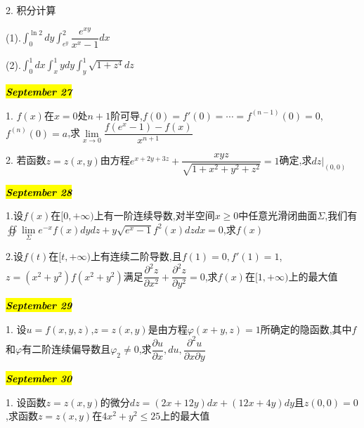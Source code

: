 2. 积分计算

(1).$\int_{0}^{\ln 2}dy\int_{e^{y}}^{2}\dfrac{e^{xy}}{x^{x}-1}dx$

(2).$\int_{0}^{1}dx\int_{x}^{1}ydy\int_{y}^{1}\sqrt{1+z^4}dz$
\begin{solution}
	
\end{solution}

\hl{\textbf{\textit{September 27}}}

1. $f(x)$在$x=0$处$n+1$阶可导,$f(0)=f'(0)=\cdots=f^{(n-1)}(0)=0$,$f^{(n)}(0)=a$,求$\lim\limits_{x\rightarrow 0}\dfrac{f(e^{x}-1)-f(x)}{x^{n+1}}$
\begin{solution}
	
\end{solution}

2. 若函数$z=z(x,y)$由方程$e^{x+2y+3z}+\dfrac{xyz}{\sqrt{1+x^2+y^2+z^2}}=1$确定,求$dz|_{(0,0)}$
\begin{solution}
	
\end{solution}

\hl{\textbf{\textit{September 28}}}

1.设$f(x)$在$[0,+\infty)$上有一阶连续导数,对半空间$x\geq 0$中任意光滑闭曲面$\varSigma$,我们有$\oiint\lim\limits_{\varSigma}e^{-x}f(x)dydz+y\sqrt{e^{x}-1}f^{2}(x)dzdx=0$,求$f(x)$
\begin{solution}
	
\end{solution}

2.设$f(t)$在$[t,+\infty)$上有连续二阶导数,且$f(1)=0,f'(1)=1$,$z=(x^2+y^2)f(x^2+y^2)$满足$\dfrac{\partial^2 z}{\partial x^2}+\dfrac{\partial^2 z}{\partial y^2}=0$,求$f(x)$在$[1,+\infty)$上的最大值
\begin{solution}
	
\end{solution}

\hl{\textbf{\textit{September 29}}}

1. 设$u=f(x,y,z)$,$z=z(x,y)$是由方程$\varphi(x+y,z)=1$所确定的隐函数,其中$f$和$\varphi$有二阶连续偏导数且$\varphi_{2}\neq 0$,求$\dfrac{\partial u}{\partial x},du,\dfrac{\partial^2 u}{\partial x\partial y}$
\begin{solution}
	
\end{solution}

\hl{\textbf{\textit{September 30}}}

1. 设函数$z=z(x,y)$的微分$dz=(2x+12y)dx+(12x+4y)dy$且$z(0,0)=0$,求函数$z=z(x,y)$在$4x^2+y^2\leq 25$上的最大值
\begin{solution}
	
\end{solution}
























